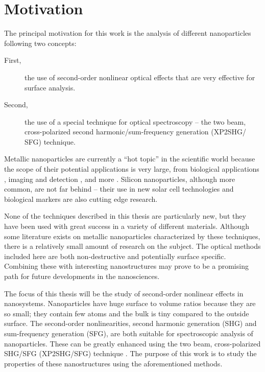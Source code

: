 \documentclass[10pt]{article}
\begin{document}
\section{Motivation}
The principal motivation for this work is the analysis of different nanoparticles following two concepts:

\begin{description}
\item[First,] the use of second-order nonlinear optical effects that are very effective for surface analysis.
\item[Second,] the use of a special technique for optical spectroscopy -- the two beam, cross-polarized second harmonic/sum-frequency generation (XP2SHG/ SFG) technique. 
\end{description}

Metallic nanoparticles are currently a ``hot topic'' in the scientific world because the scope of their potential applications is very large, from biological applications \cite{baroli2007penetration}, imaging and detection \cite{lindfors2004detection, haick2007chemical, berciaud2006photothermal}, and more \cite{kamyshny2005ink, krenn1999squeezing}. Silicon nanoparticles, although more common, are not far behind -- their use in new solar cell technologies \cite{pillai2007surface} and biological markers \cite{li2004water} are also cutting edge research. 

None of the techniques described in this thesis are particularly new, but they have been used with great success in a variety of different materials. Although some literature exists on metallic nanoparticles characterized by these techniques, there is a relatively small amount of research on the subject. The optical methods included here are both non-destructive and potentially surface specific. Combining these with interesting nanostructures may prove to be a promising path for future developments in the nanosciences.

The focus of this thesis will be the study of second-order nonlinear effects in nanosystems. Nanoparticles have huge surface to volume ratios because they are so small; they contain few atoms and the bulk is tiny compared to the outside surface. The second-order nonlinearities, second harmonic generation (SHG) and sum-frequency generation (SFG), are both suitable for spectroscopic analysis of nanoparticles. These can be greatly enhanced using the two beam, cross-polarized SHG/SFG (XP2SHG/SFG) technique \cite{figliozzi2005single}. The purpose of this work is to study the properties of these nanostructures using the aforementioned methods.
\end{document}
